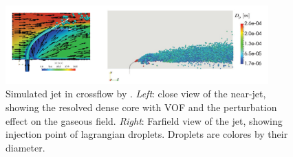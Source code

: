\begin{figure}[ht]
    \centering
    \includegraphics[width=0.9\textwidth]{./part1_numerical_approaches/figures_ch3/fontes_2019_lagrangian_fields}
       \centering
    \caption{Simulated jet in crossflow by . \textsl{Left}: close view of the near-jet, showing the resolved dense core with VOF and the perturbation effect on the gaseous field. \textsl{Right}: Farfield view of the jet, showing injection point of lagrangian droplets. Droplets are colores by their diameter. }
    \label{fig:fontes_2019_lagrangian_fields}
\end{figure}

 